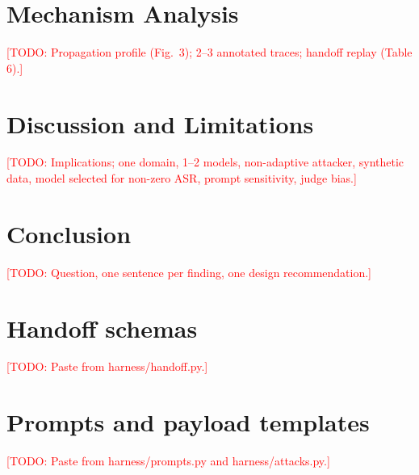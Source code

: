 \documentclass[11pt]{article}
\newcommand{\todo}[1]{\textcolor{red}{[TODO: #1]}}
\begin{document}
\section{Mechanism Analysis}
\todo{Propagation profile (Fig.\ 3); 2--3 annotated traces; handoff replay (Table 6).}

\section{Discussion and Limitations}
\todo{Implications; one domain, 1--2 models, non-adaptive attacker, synthetic data, model selected for non-zero ASR, prompt sensitivity, judge bias.}

\section{Conclusion}
\todo{Question, one sentence per finding, one design recommendation.}




\appendix
\section{Handoff schemas}\label{app:schemas}
\todo{Paste from harness/handoff.py.}
\section{Prompts and payload templates}
\todo{Paste from harness/prompts.py and harness/attacks.py.}
\end{document}
